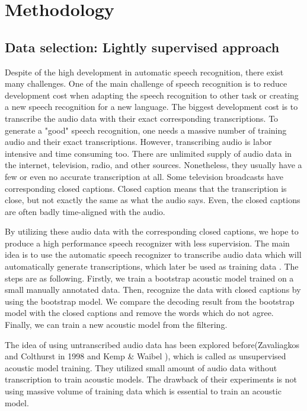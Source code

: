 \chapter{Methodology}

\section{Data selection: Lightly supervised approach}
Despite of the high development in automatic speech recognition, there exist many challenges. One of the main challenge of speech recognition is to reduce development cost when adapting the speech recognition to other task or creating a new speech recognition for a new language. The biggest development cost is to transcribe the audio data with their exact corresponding transcriptions. To generate a "good" speech recognition, one needs a massive number of training audio and their exact transcriptions. However, transcribing audio is labor intensive and time consuming too. There are unlimited supply of audio data in the internet, television, radio, and other sources. Nonetheless, they usually have a few or even no accurate transcription at all.  Some television broadcasts have corresponding closed captions.  Closed caption means that the transcription is close, but not exactly the same as what the audio says. Even, the closed captions are often badly time-aligned with the audio.

By utilizing these audio data with the corresponding closed captions, we hope to produce a high performance speech recognizer with less supervision. The main idea is to use the automatic speech recognizer to transcribe audio data which will automatically generate transcriptions, which later be used as training data \cite{lightlySupervised}. The steps are as following. Firstly, we train a bootstrap acoustic model trained on a small manually annotated data. Then, recognize the data with closed captions by using the bootstrap model. We compare the decoding result from the bootstrap model with the closed captions and remove the words which do not agree. Finally, we can train a new acoustic model from the filtering.

The idea of using untranscribed audio data has been explored before(Zavaliagkos and Colthurst in 1998 \cite{Zavaliagkos1998UtilizingUT} and Kemp \& Waibel \cite{Kemp_unsupervisedtraining}), which is called as unsupervised acoustic model training. They utilized small amount of audio data without transcription to train acoustic models. The drawback of their experiments is not using massive volume of training data which is essential to train an acoustic model.

